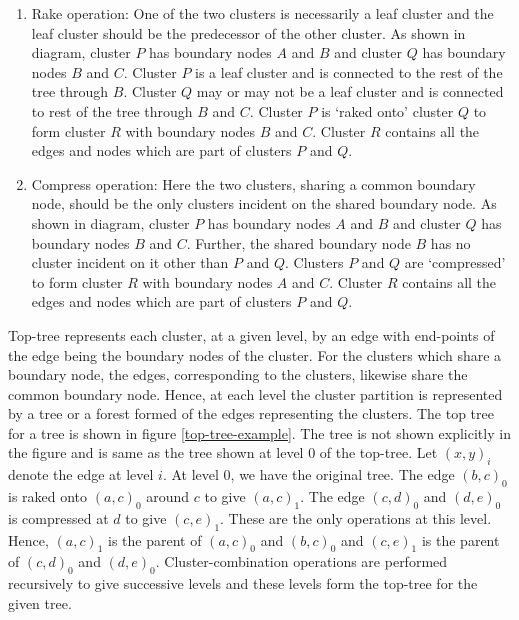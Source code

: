\documentclass[a4paper,12pt]{article}
\begin{document}
\begin{enumerate}
\item Rake operation: One of the two clusters is necessarily a leaf cluster and the leaf cluster should be the predecessor of the other cluster. As shown in diagram, cluster $P$ has boundary nodes $A$ and $B$ and cluster $Q$ has boundary nodes $B$ and $C$. Cluster $P$ is a leaf cluster and is connected to the rest of the tree through $B$. Cluster $Q$ may or may not be a leaf cluster and is connected to rest of the tree through $B$ and $C$. Cluster $P$ is `raked onto' cluster $Q$ to form cluster $R$ with boundary nodes $B$ and $C$. Cluster $R$ contains all the edges and nodes which are part of clusters $P$ and $Q$.\\


\item Compress operation: Here the two clusters, sharing a common boundary node, should be the only clusters incident on the shared boundary node. As shown in diagram, cluster $P$ has boundary nodes $A$ and $B$ and cluster $Q$ has boundary nodes $B$ and $C$. Further, the shared boundary node $B$ has no cluster incident on it other than $P$ and $Q$. Clusters $P$ and $Q$ are `compressed' to form cluster $R$ with boundary nodes $A$ and $C$. Cluster $R$ contains all the edges and nodes which are part of clusters $P$ and $Q$.\\
\end{enumerate}


Top-tree represents each cluster, at a given level, by an edge with end-points of the edge being the boundary nodes of the cluster. For the clusters which share a boundary node, the edges, corresponding to the clusters, likewise share the common boundary node. Hence, at each level the cluster partition is represented by a tree or a forest formed of the edges representing the clusters. The top tree for a tree is shown in figure \ref{top-tree-example}. The tree is not shown explicitly in the figure and is same as the tree shown at level 0 of the top-tree. Let $(x,y)_i$ denote the edge at level $i$. At level 0, we have the original tree. The edge $(b,c)_{0}$ is raked onto $(a,c)_{0}$ around $c$ to give $(a,c)_{1}$. The edge $(c,d)_{0}$ and $(d,e)_{0}$ is compressed at $d$ to give $(c,e)_{1}$. These are the only operations at this level. Hence, $(a,c)_{1}$ is the parent of $(a,c)_0$ and $(b,c)_0$ and $(c,e)_1$ is the parent of $(c,d)_0$ and $(d,e)_0$. Cluster-combination operations are performed recursively to give successive levels and these levels form the top-tree for the given tree. 
\end{document}
